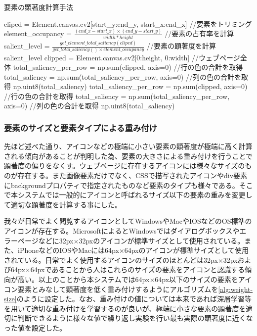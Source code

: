 \begin{algorithm}[H]
  \small
  \caption{要素の顕著度計算手法}
  \label{alg:element_saliency}
  \begin{algorithmic}
    \State cliped = Element.canvas.cv2[start\_y:end\_y, start\_x:end\_x] //要素をトリミング
    \State element\_occupancy = $\frac{(end\_x - start\_x) \times (end\_y - start\_y)}{width * height}$ //要素の占有率を計算
    \State salient\_level = $\frac{get\_element\_total\_saliency(cliped)}{get\_total\_saliency() \times element\_occupancy}$ //要素の顕著度を計算
    \State \Return salient\_level
  \Else
    \State {}
  \EndIf
  \EndFunction
  \State
    \State clipped = Element.canvas.cv2[0:height, 0:width] //ウェブページ全体
    \State total\_saliency\_per\_row = np.sum(clipped, axis=0) //行の色の合計を取得
    \State total\_saliency = np.sum(total\_saliency\_per\_row, axis=0) //列の色の合計を取得
    \State \Return np.uint8(total\_saliency)
  \EndFunction
  \State
    \State total\_saliency\_per\_row = np.sum(clipped, axis=0) //行の色の合計を取得
    \State total\_saliency = np.sum(total\_saliency\_per\_row, axis=0) //列の色の合計を取得
    \State \Return np.uint8(total\_saliency)
  \EndFunction
  \end{algorithmic}
\end{algorithm}

\subsubsection{要素のサイズと要素タイプによる重み付け}\label{subsec:system03-1}
\par 先ほど述べた通り、アイコンなどの極端に小さい要素の顕著度が極端に高く計算される傾向があることが判明した為、要素の大きさによる重み付けを行うことで顕著度の偏りをなくす。ウェブページに存在するアイコンには様々なサイズのものが存在する。また画像要素だけでなく、CSSで描写されたアイコンやdiv要素にbackgroundプロパティで指定されたものなど要素のタイプも様々である。そこで本システムでは一般的にアイコンと呼ばれるサイズ以下の要素の重みを変更して適切な顕著度を計算する事にした。

\par 我々が日常でよく閲覧するアイコンとしてWindowsやMacやIOSなどのOS標準のアイコンが存在する。MicrosoftによるとWindowsではダイアログボックスやエラーページなどに32px$\times$32pxのアイコンが標準サイズとして使用されている\cite{windowsicon}。また、iPhoneなどのIOSやMacには64px$\times$64pxのアイコンが標準サイズとして使用されている\cite{appleicon}。日常でよく使用するアイコンのサイズのほとんどは32px$\times$32pxおよび64px$\times$64pxであることから人はこれらのサイズの要素をアイコンと認識する傾向が高い。以上のことから本システムでは64px$\times$64px以下のサイズの要素をアイコン要素とみなして顕著度を低く重み付けするようにアルゴリズムを\ref{alg:weight-size}のように設定した。なお、重み付けの値については本来であれば深層学習等を用いて適切な重み付けを学習するのが良いが、極端に小さな要素の顕著度を適切に判断できるように様々な値で繰り返し実験を行い最も実際の顕著度に近くなった値を設定した。

